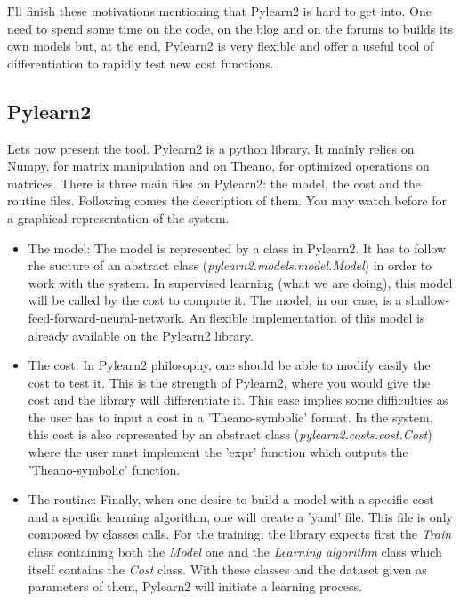 		I'll finish these motivations mentioning that Pylearn2 is hard to get into. One need to spend some time on the code, on the blog and on the forums to builds its own models but, at the end, Pylearn2 is very flexible and offer a useful tool of differentiation to rapidly test new cost functions.


	\subsection{Pylearn2}
		Lets now present the tool. Pylearn2 is a python library. It mainly relies on Numpy, for matrix manipulation and on Theano, for optimized operations on matrices. There is three main files on Pylearn2: the model, the cost and the routine files. Following comes the description of them. You may watch before  for a graphical representation of the system.
		\begin{itemize}
		  	\item The model: The model is represented by a class in Pylearn2. It has to follow rhe sucture of an abstract class (\textit{pylearn2.models.model.Model}) in order to work with the system. In supervised learning (what we are doing), this model will be called by the cost to compute it. The model, in our case, is a shallow-feed-forward-neural-network. An flexible implementation of this model is already available on the Pylearn2 library.
		  	\item The cost: In Pylearn2 philosophy, one should be able to modify easily the cost to test it. This is the strength of Pylearn2, where you would give the cost and the library will differentiate it. This ease implies some difficulties as the user has to input a cost in a 'Theano-symbolic' format. In the system, this cost is also represented by an abstract class (\textit{pylearn2.costs.cost.Cost}) where the user must implement the 'expr' function which outputs the 'Theano-symbolic' function.
		  	\item The routine: Finally, when one desire to build a model with a specific cost and a specific learning algorithm, one will create a 'yaml' file. This file is only composed by classes calls. For the training, the library expects first the \textit{Train} class containing both the \textit{Model} one and the \textit{Learning algorithm} class which itself contains the \textit{Cost} class. With these classes and the dataset given as parameters of them, Pylearn2 will initiate a learning process.
	  	\end{itemize}
			 

